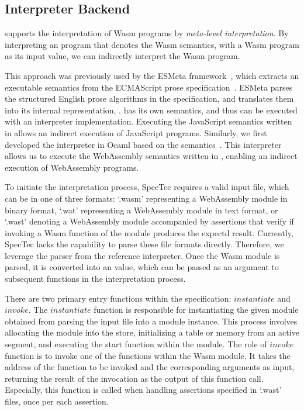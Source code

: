 \subsection{Interpreter Backend}\label{sec:interp} %
\dslname supports the interpretation of Wasm programs by \textit{meta-level interpretation}.
By interpreting an \al program that denotes the Wasm semantics, with
a Wasm program as its input value, we can indirectly interpret the Wasm program.

This approach was previously used by the ESMeta framework~\cite{esmeta,jiset},
which extracts an executable semantics from the ECMAScript prose specification~\cite{ecmascript}.
ESMeta parses the structured English prose algorithms in the specification,
and translates them into its internal representation, \ires.
\ires has its own semantics, and thus can be executed with an interpreter implementation.
Executing the JavaScript semantics written in \ires allows an indirect execution of JavaScript programs.
Similarly, we first developed the \al interpreter in Ocaml based on the \al
semantics~\cite{il-tr}.  This interpreter allows us to execute the WebAssembly
semantics written in \al, enabling an indirect execution of WebAssembly
programs.

To initiate the interpretation process, SpecTec requires a valid input file,
which can be in one of three formats: `.wasm' representing a WebAssembly module
in binary format, `.wat' representing a WebAssembly module in text format, or
`.wast' denoting a WebAssembly module accompanied by assertions that verify if
invoking a Wasm function of the module produces the expectd result.  Currently,
SpecTec lacks the capability to parse these file formats directly.  Therefore,
we leverage the parser from the reference interpreter. Once the Wasm module is
parsed, it is converted into an \al value, which can be passed as an argument
to subsequent \al functions in the interpretation process.

There are two primary entry functions within the specification:
$\mathit{instantiate}$ and $\mathit{invoke}$. The $\mathit{instantiate}$
function is responsible for instantiating the given module obtained from
parsing the input file into a module instance.  This process involves
allocating the module into the store, initializing a table or memory from an
active segment, and executing the start function within the module. The role of
$\mathit{invoke}$ function is to invoke one of the functions within the Wasm
module. It takes the address of the function to be invoked and the
corresponding arguments as input, returning the result of the invocation as the
output of this \al function call.  Especially, this function is called when
handling assertions specified in `.wast' files, once per each assertion.



